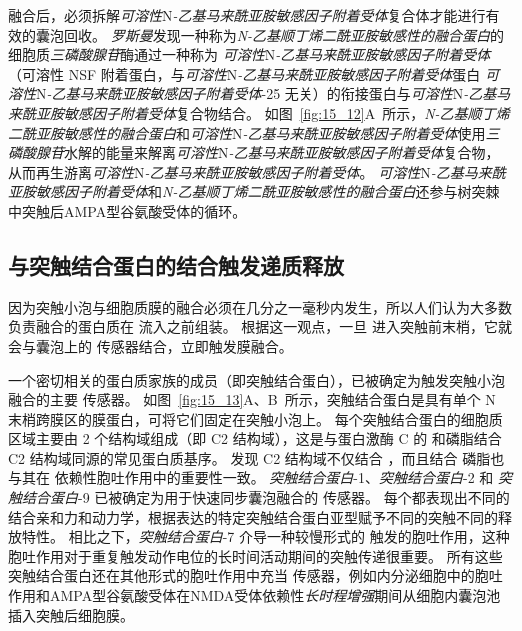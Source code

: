 融合后，必须拆解\textit{可溶性}N\textit{-乙基马来酰亚胺敏感因子附着受体}复合体才能进行有效的囊泡回收。
\textit{罗斯曼}发现一种称为\textit{N-乙基顺丁烯二酰亚胺敏感性的融合蛋白}的细胞质\textit{三磷酸腺苷}酶通过一种称为 \textit{可溶性}N\textit{-乙基马来酰亚胺敏感因子附着受体}（可溶性 NSF 附着蛋白，与\textit{可溶性}N\textit{-乙基马来酰亚胺敏感因子附着受体}蛋白 \textit{可溶性}N\textit{-乙基马来酰亚胺敏感因子附着受体}-25 无关）的衔接蛋白与\textit{可溶性}N\textit{-乙基马来酰亚胺敏感因子附着受体}复合物结合。
如图~\ref{fig:15_12}A~所示，\textit{N-乙基顺丁烯二酰亚胺敏感性的融合蛋白}和\textit{可溶性}N\textit{-乙基马来酰亚胺敏感因子附着受体}使用\textit{三磷酸腺苷}水解的能量来解离\textit{可溶性}N\textit{-乙基马来酰亚胺敏感因子附着受体}复合物，从而再生游离\textit{可溶性}N\textit{-乙基马来酰亚胺敏感因子附着受体}。
\textit{可溶性}N\textit{-乙基马来酰亚胺敏感因子附着受体}和\textit{N-乙基顺丁烯二酰亚胺敏感性的融合蛋白}还参与树突棘中突触后AMPA型谷氨酸受体的循环。



\subsection{与突触结合蛋白的结合触发递质释放}

因为突触小泡与细胞质膜的融合必须在几分之一毫秒内发生，所以人们认为大多数负责融合的蛋白质在  流入之前组装。
根据这一观点，一旦  进入突触前末梢，它就会与囊泡上的  传感器结合，立即触发膜融合。


一个密切相关的蛋白质家族的成员（即突触结合蛋白），已被确定为触发突触小泡融合的主要  传感器。
如图~\ref{fig:15_13}A、B~所示，突触结合蛋白是具有单个 N 末梢跨膜区的膜蛋白，可将它们固定在突触小泡上。
每个突触结合蛋白的细胞质区域主要由 2 个结构域组成（即 C2 结构域），这是与蛋白激酶 C 的  和磷脂结合 C2 结构域同源的常见蛋白质基序。
发现 C2 结构域不仅结合 ，而且结合 磷脂也与其在  依赖性胞吐作用中的重要性一致。
\textit{突触结合蛋白}-1、\textit{突触结合蛋白}-2 和 \textit{突触结合蛋白}-9 已被确定为用于快速同步囊泡融合的  传感器。
每个都表现出不同的  结合亲和力和动力学，根据表达的特定突触结合蛋白亚型赋予不同的突触不同的释放特性。
相比之下，\textit{突触结合蛋白}-7 介导一种较慢形式的  触发的胞吐作用，这种胞吐作用对于重复触发动作电位的长时间活动期间的突触传递很重要。
所有这些突触结合蛋白还在其他形式的胞吐作用中充当  传感器，例如内分泌细胞中的胞吐作用和AMPA型谷氨酸受体在NMDA受体依赖性\textit{长时程增强}期间从细胞内囊泡池插入突触后细胞膜。


